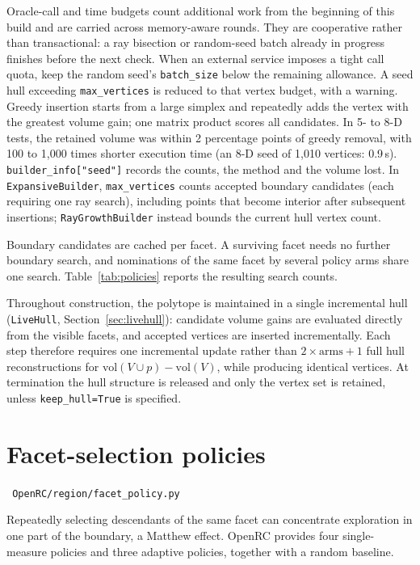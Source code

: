 \documentclass[11pt,a4paper]{report}
\newcommand{\why}[1]{\par\medskip\begingroup\noindent #1\par\endgroup\medskip}
\newcommand{\code}[1]{\texttt{\small #1}}
\newcommand{\file}[1]{\texttt{\small\color{nbgrey} #1}}
\begin{document}
Oracle-call and time budgets count additional work from the beginning of this
build and are carried across memory-aware rounds. They are cooperative rather
than transactional: a ray bisection or random-seed batch already in progress
finishes before the next check. When an external service imposes a tight call
quota, keep the random seed's \code{batch\_size} below the remaining allowance.
A seed hull exceeding \code{max\_vertices} is reduced to that vertex budget,
with a warning. Greedy insertion starts from a large simplex and repeatedly
adds the vertex with the greatest volume gain; one matrix product scores all
candidates. In 5- to 8-D tests, the retained volume was within 2 percentage
points of greedy removal, with 100 to 1,000 times shorter execution time
(an 8-D seed of 1,010 vertices: 0.9\,s). \code{builder\_info["seed"]} records the
counts, the method and the volume lost. In \code{ExpansiveBuilder},
\code{max\_vertices} counts accepted boundary candidates (each requiring one
ray search), including points that become interior after subsequent insertions;
\code{RayGrowthBuilder} instead bounds the current hull vertex count.

\why{Boundary candidates are cached per facet. A surviving facet needs no
further boundary search, and nominations of the same facet by several policy
arms share one search. Table~\ref{tab:policies} reports the resulting search
counts.}

Throughout construction, the polytope is maintained in a single incremental
hull (\code{LiveHull}, Section~\ref{sec:livehull}): candidate volume gains are
evaluated directly from the visible facets, and accepted vertices are inserted
incrementally. Each step therefore requires one incremental update rather than
$2\times\text{arms}+1$ full hull reconstructions for
$\mathrm{vol}(V\cup p)-\mathrm{vol}(V)$, while producing identical vertices.
At termination the hull structure is released and only the vertex set is
retained, unless \code{keep\_hull=True} is specified.

\section{Facet-selection policies}
\label{sec:policies}

\file{OpenRC/region/facet\_policy.py}

Repeatedly selecting descendants of the same facet can concentrate exploration
in one part of the boundary, a Matthew effect. OpenRC provides four
single-measure policies and three adaptive policies, together with a random
baseline.
\end{document}
